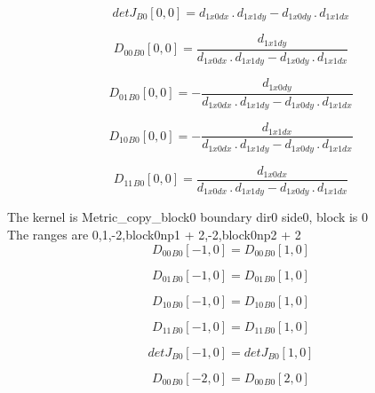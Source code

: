 \documentclass{article}
\begin{document}
\begin{dmath}{detJ{_{B0}}}[{0,0}] = d_{1 x0 dx} \,.\, d_{1 x1 dy} - d_{1 x0 dy} \,.\, d_{1 x1 dx}\end{dmath}

\begin{dmath}{D_{00}{_{B0}}}[{0,0}] = \frac{d_{1 x1 dy}}{d_{1 x0 dx} \,.\, d_{1 x1 dy} - d_{1 x0 dy} \,.\, d_{1 x1 dx}}\end{dmath}

\begin{dmath}{D_{01}{_{B0}}}[{0,0}] = - \frac{d_{1 x0 dy}}{d_{1 x0 dx} \,.\, d_{1 x1 dy} - d_{1 x0 dy} \,.\, d_{1 x1 dx}}\end{dmath}

\begin{dmath}{D_{10}{_{B0}}}[{0,0}] = - \frac{d_{1 x1 dx}}{d_{1 x0 dx} \,.\, d_{1 x1 dy} - d_{1 x0 dy} \,.\, d_{1 x1 dx}}\end{dmath}

\begin{dmath}{D_{11}{_{B0}}}[{0,0}] = \frac{d_{1 x0 dx}}{d_{1 x0 dx} \,.\, d_{1 x1 dy} - d_{1 x0 dy} \,.\, d_{1 x1 dx}}\end{dmath}

\noindent The kernel is Metric_copy_block0 boundary dir0 side0, block is 0\\\noindent The ranges are 0,1,-2,block0np1 + 2,-2,block0np2 + 2\\\begin{dmath}{D_{00}{_{B0}}}[{-1,0}] = {D_{00}{_{B0}}}[{1,0}]\end{dmath}

\begin{dmath}{D_{01}{_{B0}}}[{-1,0}] = {D_{01}{_{B0}}}[{1,0}]\end{dmath}

\begin{dmath}{D_{10}{_{B0}}}[{-1,0}] = {D_{10}{_{B0}}}[{1,0}]\end{dmath}

\begin{dmath}{D_{11}{_{B0}}}[{-1,0}] = {D_{11}{_{B0}}}[{1,0}]\end{dmath}

\begin{dmath}{detJ{_{B0}}}[{-1,0}] = {detJ{_{B0}}}[{1,0}]\end{dmath}

\begin{dmath}{D_{00}{_{B0}}}[{-2,0}] = {D_{00}{_{B0}}}[{2,0}]\end{dmath}
\end{document}
